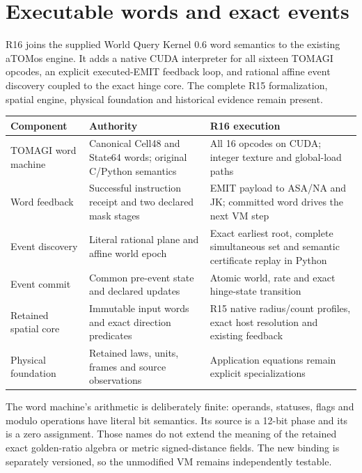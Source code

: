 \section*{Executable words and exact events}
R16 joins the supplied World Query Kernel 0.6 word semantics to the
existing aTOMos engine. It adds a native CUDA interpreter for all sixteen
TOMAGI opcodes, an explicit executed-EMIT feedback loop, and rational affine
event discovery coupled to the exact hinge core. The complete R15
formalization, spatial engine, physical foundation and historical evidence
remain present.

\begin{center}\small
\begin{tabularx}{\linewidth}{@{}P{34mm}Y Y@{}}
\toprule Component & Authority & R16 execution\\\midrule
TOMAGI word machine & Canonical Cell48 and State64 words; original C/Python semantics & All 16 opcodes on CUDA; integer texture and global-load paths\\
Word feedback & Successful instruction receipt and two declared mask stages & EMIT payload to ASA/NA and JK; committed word drives the next VM step\\
Event discovery & Literal rational plane and affine world epoch & Exact earliest root, complete simultaneous set and semantic certificate replay in Python\\
Event commit & Common pre-event state and declared updates & Atomic world, rate and exact hinge-state transition\\
Retained spatial core & Immutable input words and exact direction predicates & R15 native radius/count profiles, exact host resolution and existing feedback\\
Physical foundation & Retained laws, units, frames and source observations & Application equations remain explicit specializations\\
\bottomrule
\end{tabularx}\end{center}

The word machine's arithmetic is deliberately finite: operands, statuses,
flags and modulo operations have literal bit semantics. Its source
 is a 12-bit phase and its  is a zero assignment.
Those names do not extend the meaning of the retained exact golden-ratio
algebra or metric signed-distance fields. The new binding is separately
versioned, so the unmodified VM remains independently testable.

